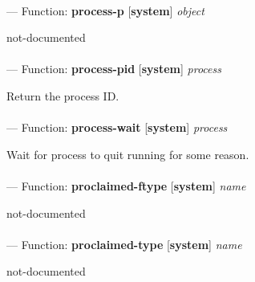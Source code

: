 \paragraph{}
\label{SYSTEM:PROCESS-P}
--- Function: \textbf{process-p} [\textbf{system}] \textit{object}

\begin{adjustwidth}{5em}{5em}
not-documented
\end{adjustwidth}

\paragraph{}
\label{SYSTEM:PROCESS-PID}
--- Function: \textbf{process-pid} [\textbf{system}] \textit{process}

\begin{adjustwidth}{5em}{5em}
Return the process ID.
\end{adjustwidth}

\paragraph{}
\label{SYSTEM:PROCESS-WAIT}
--- Function: \textbf{process-wait} [\textbf{system}] \textit{process}

\begin{adjustwidth}{5em}{5em}
Wait for process to quit running for some reason.
\end{adjustwidth}

\paragraph{}
\label{SYSTEM:PROCLAIMED-FTYPE}
--- Function: \textbf{proclaimed-ftype} [\textbf{system}] \textit{name}

\begin{adjustwidth}{5em}{5em}
not-documented
\end{adjustwidth}

\paragraph{}
\label{SYSTEM:PROCLAIMED-TYPE}
--- Function: \textbf{proclaimed-type} [\textbf{system}] \textit{name}

\begin{adjustwidth}{5em}{5em}
not-documented
\end{adjustwidth}

